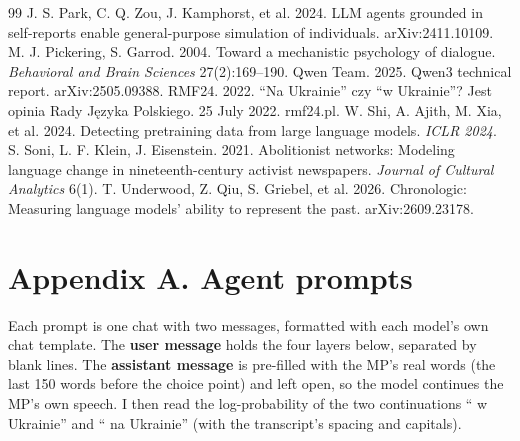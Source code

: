\documentclass[10pt,twocolumn]{article}
\begin{document}
\begin{thebibliography}{99}
 J. S. Park, C. Q. Zou, J. Kamphorst, et al. 2024. LLM agents grounded in self-reports enable general-purpose simulation of individuals. arXiv:2411.10109.
 M. J. Pickering, S. Garrod. 2004. Toward a mechanistic psychology of dialogue. \emph{Behavioral and Brain Sciences} 27(2):169--190.
 Qwen Team. 2025. Qwen3 technical report. arXiv:2505.09388.
 RMF24. 2022. ``Na Ukrainie'' czy ``w Ukrainie''? Jest opinia Rady Języka Polskiego. 25 July 2022. rmf24.pl.
 W. Shi, A. Ajith, M. Xia, et al. 2024. Detecting pretraining data from large language models. \emph{ICLR 2024}.
 S. Soni, L. F. Klein, J. Eisenstein. 2021. Abolitionist networks: Modeling language change in nineteenth-century activist newspapers. \emph{Journal of Cultural Analytics} 6(1).
 T. Underwood, Z. Qiu, S. Griebel, et al. 2026. Chronologic: Measuring language models' ability to represent the past. arXiv:2609.23178.
\end{thebibliography}

\clearpage
\onecolumn
\raggedbottom
\appendix
\section*{Appendix A. Agent prompts}
Each prompt is one chat with two messages, formatted with each model's own chat template. The \textbf{user message} holds the four layers below, separated by blank lines. The \textbf{assistant message} is pre-filled with the MP's real words (the last 150 words before the choice point) and left open, so the model continues the MP's own speech. I then read the log-probability of the two continuations `` w Ukrainie'' and `` na Ukrainie'' (with the transcript's spacing and capitals).
\end{document}

